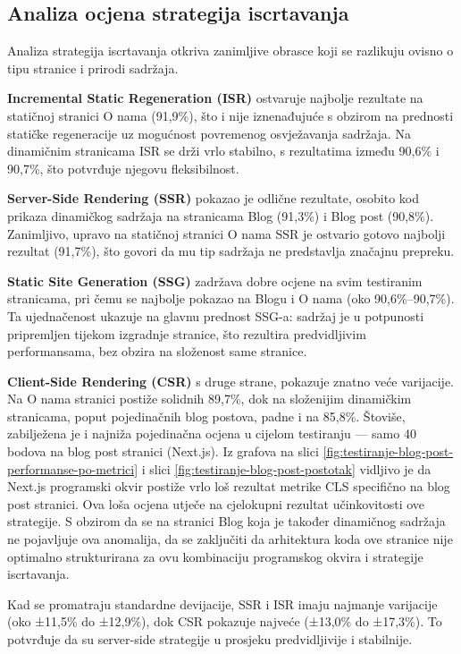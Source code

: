 \subsection{Analiza ocjena strategija iscrtavanja}

Analiza strategija iscrtavanja otkriva zanimljive obrasce koji se razlikuju ovisno o tipu stranice i prirodi sadržaja.

\textbf{Incremental Static Regeneration (ISR)} ostvaruje najbolje rezultate na statičnoj stranici O nama (91,9\%), što i nije iznenađujuće s obzirom na prednosti statičke regeneracije uz mogućnost povremenog osvježavanja sadržaja. Na dinamičnim stranicama ISR se drži vrlo stabilno, s rezultatima između 90,6\% i 90,7\%, što potvrđuje njegovu fleksibilnost.

\textbf{Server-Side Rendering (SSR)} pokazao je odlične rezultate, osobito kod prikaza dinamičkog sadržaja na stranicama Blog (91,3\%) i Blog post (90,8\%). Zanimljivo, upravo na statičnoj stranici O nama SSR je ostvario gotovo najbolji rezultat (91,7\%), što govori da mu tip sadržaja ne predstavlja značajnu prepreku.

\textbf{Static Site Generation (SSG)} zadržava dobre ocjene na svim testiranim stranicama, pri čemu se najbolje pokazao na Blogu i O nama (oko 90,6\%–90,7\%). Ta ujednačenost ukazuje na glavnu prednost SSG-a: sadržaj je u potpunosti pripremljen tijekom izgradnje stranice, što rezultira predvidljivim performansama, bez obzira na složenost same stranice.

\textbf{Client-Side Rendering (CSR)} s druge strane, pokazuje znatno veće varijacije. Na O nama stranici postiže solidnih 89,7\%, dok na složenijim dinamičkim stranicama, poput pojedinačnih blog postova, padne i na 85,8\%. Štoviše, zabilježena je i najniža pojedinačna ocjena u cijelom testiranju — samo 40 bodova na blog post stranici (Next.js). Iz grafova
na slici \ref{fig:testiranje-blog-post-performanse-po-metrici} i slici \ref{fig:testiranje-blog-post-postotak} vidljivo je da Next.js programski okvir postiže vrlo loš rezultat metrike CLS specifično na blog post stranici. Ova loša ocjena utječe na cjelokupni rezultat učinkovitosti ove strategije. S obzirom da se na stranici Blog koja je također dinamičnog sadržaja ne pojavljuje ova anomalija, da se zaključiti da arhitektura koda ove stranice nije optimalno strukturirana za ovu kombinaciju programskog okvira i strategije iscrtavanja.

Kad se promatraju standardne devijacije, SSR i ISR imaju najmanje varijacije (oko ±11,5\% do ±12,9\%), dok CSR pokazuje najveće (±13,0\% do ±17,3\%). To potvrđuje da su server-side strategije u prosjeku predvidljivije i stabilnije.

